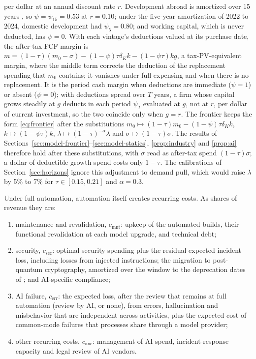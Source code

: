 \begin{remark}[Taxes]
per dollar at an annual discount rate $r$. Development abroad is amortized over 15 years \citep{usc2026sec174}, so $\psi=\psi_{15}=0.53$ at $r=0.10$; under the five-year amortization of 2022 to 2024, domestic development had $\psi_5=0.80$; and working capital, which is never deducted, has $\psi=0$. With each vintage's deductions valued at its purchase date, the after-tax FCF margin is $m=(1-\tau)(m_0-\sigma)-(1-\psi)\tau\delta_Kk-(1-\psi\tau)kg$, a tax-PV-equivalent margin, where the middle term corrects the deduction of the replacement spending that $m_0$ contains; it vanishes under full expensing and when there is no replacement. It is the period cash margin when deductions are immediate ($\psi=1$) or absent ($\psi=0$); with deductions spread over $T$ years, a firm whose capital grows steadily at $g$ deducts in each period $\psi_T$ evaluated at $g$, not at $r$, per dollar of current investment, so the two coincide only when $g=r$. The frontier keeps the form \eqref{eq:frontier} after the substitutions $m_0\mapsto(1-\tau)m_0-(1-\psi)\tau\delta_Kk$, $k\mapsto(1-\psi\tau)k$, $\lambda\mapsto(1-\tau)^{-\alpha}\lambda$ and $\bar\sigma\mapsto(1-\tau)\bar\sigma$. The results of Sections~\ref{sec:model-frontier}--\ref{sec:model-statics}, \autoref{prop:industry} and \autoref{prop:ai} therefore hold after these substitutions, with $\sigma$ read as after-tax spend $(1-\tau)\sigma$; a dollar of deductible growth spend costs only $1-\tau$. The calibrations of Section~\ref{sec:horizons} ignore this adjustment to demand pull, which would raise $\lambda$ by 5\% to 7\% for $\tau\in[0.15,0.21]$ and $\alpha=0.3$.
\end{remark}

\begin{definition}\label{def:fullcost}
Under full automation, automation itself creates recurring costs. As shares of revenue they are:
\begin{enumerate}
\item[(i)] maintenance and revalidation, $c_{\mathrm{mnt}}$: upkeep of the automated builds, their functional revalidation at each model upgrade, and technical debt;
\item[(ii)] security, $c_{\mathrm{sec}}$: optimal security spending plus the residual expected incident loss, including losses from injected instructions; the migration to post-quantum cryptography, amortized over the window to the deprecation dates of \citet{moody2026transition}; and AI-specific compliance;
\item[(iii)] AI failure, $c_{\mathrm{err}}$: the expected loss, after the review that remains at full automation (review by AI, or none), from errors, hallucination and misbehavior that are independent across activities, plus the expected cost of common-mode failures that processes share through a model provider;
\item[(iv)] other recurring costs, $c_{\mathrm{anc}}$: management of AI spend, incident-response capacity and legal review of AI vendors.
\end{enumerate}
\end{definition}

